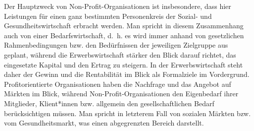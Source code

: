\documentclass[
  letterpaper,
]{book}
\begin{document}
Der Hauptzweck von Non-Profit-Organisationen ist insbesondere, dass hier
Leistungen für einen ganz bestimmten Personenkreis der Sozial- und
Gesundheitswirtschaft erbracht werden. Man spricht in diesem
Zusammenhang auch von einer Bedarfswirtschaft, d.~h. es wird immer
anhand von gesetzlichen Rahmenbedingungen bzw. den Bedürfnissen der
jeweiligen Zielgruppe aus geplant, während die Erwerbswirtschaft stärker
den Blick darauf richtet, das eingesetzte Kapital und den Ertrag zu
steigern. In der Erwerbswirtschaft steht daher der Gewinn und die
Rentabilität im Blick als Formalziele im Vordergrund. Profitorientierte
Organisationen haben die Nachfrage und das Angebot auf Märkten im Blick,
während Non-Profit-Organisationen den Eigenbedarf ihrer Mitglieder,
Klient*innen bzw. allgemein den gesellschaftlichen Bedarf
berücksichtigen müssen. Man spricht in letzterem Fall von sozialen
Märkten bzw. vom Gesundheitsmarkt, was einen abgegrenzten Bereich
darstellt.
\end{document}
